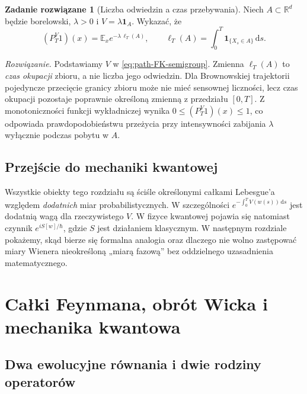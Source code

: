 \documentclass[11pt,a4paper,oneside]{report}
\numberwithin{equation}{chapter}
\theoremstyle{plain}
\theoremstyle{definition}
\newtheorem{zadanie}{Zadanie rozwiązane}[chapter]
\theoremstyle{remark}
\newcommand{\R}{\mathbb{R}}
\newcommand{\E}{\mathbb{E}}
\newcommand{\ind}[1]{\mathbf{1}_{#1}}
\newcommand{\dd}{\mathrm{d}}
\begin{document}
\begin{zadanie}[Liczba odwiedzin a czas przebywania]
Niech $A\subset\R^d$ będzie borelowski,
$\lambda>0$ i $V=\lambda\ind{A}$. Wykazać, że
\[
 (P_T^V1)(x)=\E_x e^{-\lambda\,\ell_T(A)},
 \qquad \ell_T(A)=\int_0^T\ind{\{X_s\in A\}}\,\dd s.
\]

\emph{Rozwiązanie.} Podstawiamy $V$ w
\eqref{eq:path-FK-semigroup}. Zmienna $\ell_T(A)$
to \emph{czas okupacji} zbioru, a nie liczba jego odwiedzin.
Dla Brownowskiej trajektorii pojedyncze przecięcie granicy
zbioru może nie mieć sensownej liczności, lecz czas
okupacji pozostaje poprawnie określoną zmienną z przedziału
$[0,T]$. Z monotoniczności funkcji wykładniczej wynika
$0\le (P_T^V1)(x)\le1$, co odpowiada prawdopodobieństwu
przeżycia przy intensywności zabijania $\lambda$ wyłącznie
podczas pobytu w $A$.
\end{zadanie}

\section{Przejście do mechaniki kwantowej}

Wszystkie obiekty tego rozdziału są ściśle określonymi
całkami Lebesgue'a względem \emph{dodatnich} miar
probabilistycznych. W szczególności
$e^{-\int_0^T V(w(s))\,\dd s}$ jest dodatnią wagą dla
rzeczywistego $V$. W fizyce kwantowej pojawia się natomiast
czynnik $e^{iS[w]/\hbar}$, gdzie $S$ jest działaniem
klasycznym. W następnym rozdziale pokażemy, skąd bierze się
formalna analogia oraz dlaczego nie wolno zastępować
miary Wienera nieokreśloną „miarą fazową” bez oddzielnego
uzasadnienia matematycznego.


\chapter{Całki Feynmana, obrót Wicka i mechanika kwantowa}
\label{ch:feynman-path}

\section{Dwa ewolucyjne równania i dwie rodziny operatorów}
\end{document}
